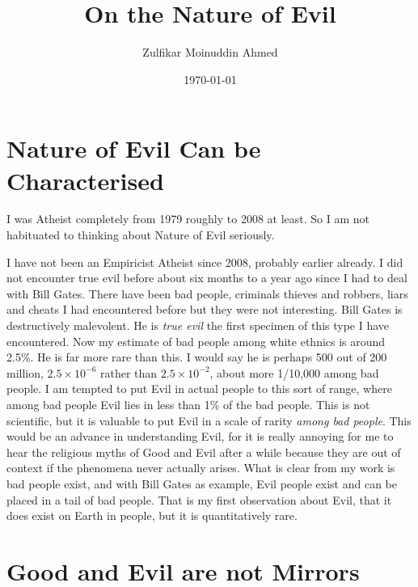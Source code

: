 \documentclass{amsart}
\title{On the Nature of Evil}
\author{Zulfikar Moinuddin Ahmed}
\date{\today}
\begin{document}
\maketitle

\section{Nature of Evil Can be Characterised}

I was Atheist completely from 1979 roughly to 2008 at least.  So I am not habituated to thinking about Nature of Evil seriously.  

I have not been an Empiricist Atheist since 2008, probably earlier already.  I did not encounter true evil before about six months to a year ago since I had to deal with Bill Gates.  There have been bad people, criminals thieves and robbers, liars and cheats I had encountered before but they were not interesting.  Bill Gates is destructively malevolent.  He is {\em true evil} the first specimen of this type I have encountered.  Now my estimate of bad people among white ethnics is around 2.5\%.  He is far more rare than this.  I would say he is perhaps 500 out of 200 million, $2.5 \times 10^{-6}$ rather than $2.5\times 10^{-2}$, about more 1/10,000 among bad people.  I am tempted to put Evil in actual people to this sort of range, where among bad people Evil lies in less than 1\% of the bad people.  This is not scientific, but it is valuable to put Evil in a scale of rarity {\em among bad people}.  This would be an advance in understanding Evil, for it is really annoying for me to hear the religious myths of Good and Evil after a while because they are out of context if the phenomena never actually arises.  What is clear from my work is bad people exist, and with Bill Gates as example, Evil people exist and can be placed in a tail of bad people.  That is my first observation about Evil, that it does exist on Earth in people, but it is quantitatively rare.

\section{Good and Evil are not Mirrors}
\end{document}
